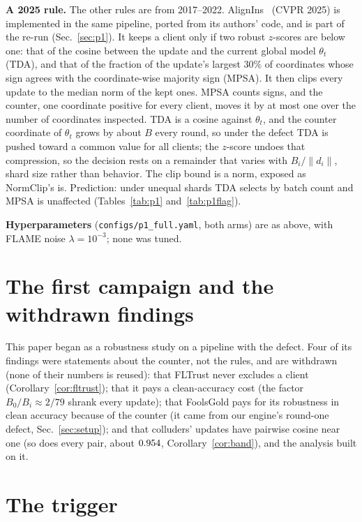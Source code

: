 \documentclass[journal]{IEEEtran}
\begin{document}
\textbf{A 2025 rule.} The other rules are from 2017--2022.
AlignIns~\cite{xu2025alignins} (CVPR 2025) is implemented in the same pipeline,
ported from its authors' code, and is part of the re-run (Sec.~\ref{sec:p1}). It keeps a client only if two robust $z$-scores are below
one: that of the cosine between the update and the current global model
$\theta_t$ (TDA), and that of the fraction of the update's largest $30\%$ of
coordinates whose sign agrees with the coordinate-wise majority sign (MPSA). It
then clips every update to the median norm of the kept ones. MPSA counts signs, and the counter, one coordinate positive for every
client, moves it by at most one over the number of coordinates inspected. TDA is a
cosine against $\theta_t$, and the counter coordinate of $\theta_t$ grows by
about $B$ every round, so under the defect TDA is pushed toward a common value for
all clients; the $z$-score undoes that compression, so the decision rests on a remainder
that varies with $B_i/\|d_i\|$, shard size rather than behavior. The clip bound is a norm,
exposed as NormClip's is. Prediction: under unequal shards TDA selects by batch count and
MPSA is unaffected (Tables~\ref{tab:p1} and~\ref{tab:p1flag}).

\textbf{Hyperparameters} (\texttt{configs/p1\_full.yaml}, both arms) are as above, with
FLAME noise $\lambda=10^{-3}$; none was tuned.

\section{The first campaign and the withdrawn findings}
\label{sup:retro}
\label{sec:retro}

This paper began as a robustness study on a pipeline with the defect. Four of its findings
were statements about the counter, not the rules, and are withdrawn (none of their numbers is
reused): that FLTrust never excludes a client (Corollary~\ref{cor:fltrust}); that it
pays a clean-accuracy cost (the factor $B_0/B_i\approx2/79$ shrank every update); that FoolsGold pays for its robustness in clean accuracy because of
the counter (it came from our engine's round-one defect, Sec.~\ref{sec:setup}); and that colluders' updates have pairwise cosine near one (so does every
pair, about $0.954$, Corollary~\ref{cor:band}), and the analysis built on it.

\section{The trigger}
\label{sup:realize}
\label{sec:realizable}
\end{document}

